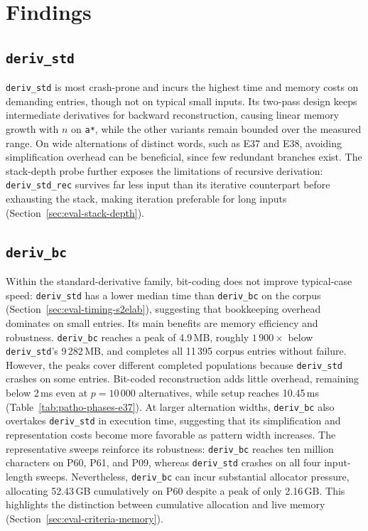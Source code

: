 %
%
%

\clearpage
\section{Findings}
\label{sec:eval-discussion}

\subsection{\texttt{deriv\_std}}

\texttt{deriv\_std}
is most crash-prone and incurs the highest
time and memory costs on demanding entries,
though not on typical small inputs.
Its two-pass design keeps intermediate
derivatives for backward reconstruction,
causing linear memory growth with $n$
on \texttt{a*}, while the other variants
remain bounded over the measured range.
On wide alternations of distinct words,
such as E37 and E38, avoiding simplification
overhead can be beneficial, since few
redundant branches exist.
The stack-depth probe further exposes
the limitations of recursive derivation:
\texttt{deriv\_std\_rec} survives far less
input than its iterative counterpart before
exhausting the stack, making iteration
preferable for long inputs
(Section~\ref{sec:eval-stack-depth}).

%
%
%


\subsection{\texttt{deriv\_bc}}
\label{sec:eval-cost-bit-coding}

Within the standard-derivative family, bit-coding
does not improve typical-case speed:
\texttt{deriv\_std} has a lower median time
than \texttt{deriv\_bc} on the corpus
(Section~\ref{sec:eval-timing-s2elab}),
suggesting that bookkeeping overhead dominates
on small entries.
Its main benefits are memory efficiency
and robustness.
\texttt{deriv\_bc} reaches a peak of 4.9\,MB,
roughly $1\,900\times$ below
\texttt{deriv\_std}'s 9\,282\,MB, and completes
all 11\,395 corpus entries without failure.
However, the peaks cover different completed
populations because \texttt{deriv\_std}
crashes on some entries.
Bit-coded reconstruction adds little overhead,
remaining below 2\,ms even at $p=10\,000$
alternatives, while setup reaches 10.45\,ms
(Table~\ref{tab:patho-phases-e37}).
At larger alternation widths,
\texttt{deriv\_bc} also overtakes
\texttt{deriv\_std} in execution time,
suggesting that its simplification and
representation costs become more favorable
as pattern width increases.
The representative sweeps reinforce its
robustness: \texttt{deriv\_bc} reaches
ten million characters on P60, P61, and P09,
whereas \texttt{deriv\_std} crashes on all four
input-length sweeps.
Nevertheless, \texttt{deriv\_bc} can incur
substantial allocator pressure, allocating
52.43\,GB cumulatively on P60 despite a
peak of only 2.16\,GB.
This highlights the distinction between
cumulative allocation and live memory
(Section~\ref{sec:eval-criteria-memory}).

